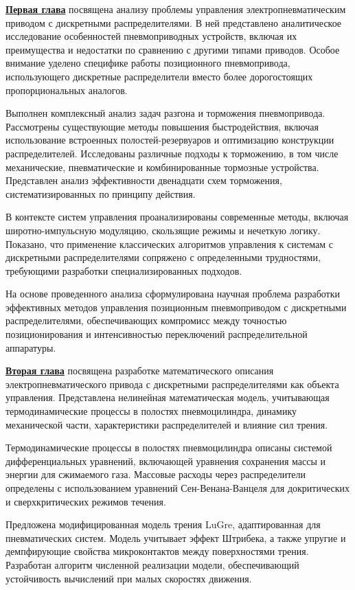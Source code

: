 \underline{\textbf{Первая глава}}
посвящена анализу проблемы управления электропневматическим приводом с
дискретными распределителями. В ней представлено аналитическое исследование
особенностей пневмоприводных устройств, включая их преимущества и недостатки
по сравнению с другими типами приводов. Особое внимание уделено специфике работы позиционного пневмопривода, использующего дискретные распределители вместо более дорогостоящих пропорциональных аналогов.

Выполнен комплексный анализ задач разгона и торможения пневмопривода. Рассмотрены
существующие методы повышения быстродействия, включая использование встроенных
полостей-резервуаров и оптимизацию конструкции распределителей. Исследованы различные
подходы к торможению, в том числе механические, пневматические и комбинированные тормозные
устройства. Представлен анализ эффективности двенадцати схем торможения, систематизированных по принципу действия.

В контексте систем управления проанализированы современные методы,
включая широтно-импульсную модуляцию, скользящие режимы и нечеткую логику.
Показано, что применение классических алгоритмов управления к системам с
дискретными распределителями сопряжено с определенными трудностями,
требующими разработки специализированных подходов.

На основе проведенного анализа сформулирована научная проблема
разработки эффективных методов управления позиционным пневмоприводом с
дискретными распределителями, обеспечивающих компромисс между точностью
позиционирования и интенсивностью переключений распределительной аппаратуры.

\underline{\textbf{Вторая глава}} 
посвящена разработке математического описания электропневматического
привода с дискретными распределителями как объекта управления. Представлена
нелинейная математическая модель, учитывающая термодинамические процессы в
полостях пневмоцилиндра, динамику механической части, характеристики распределителей и влияние сил трения.

Термодинамические процессы в полостях пневмоцилиндра описаны системой
дифференциальных уравнений, включающей уравнения сохранения массы и
энергии для сжимаемого газа. Массовые расходы через распределители определены с использованием
уравнений Сен-Венана-Ванцеля для докритических и сверхкритических режимов течения.

Предложена модифицированная модель трения LuGre, адаптированная для пневматических систем.
Модель учитывает эффект Штрибека, а также упругие и демпфирующие свойства микроконтактов
между поверхностями трения. Разработан алгоритм численной реализации модели,
обеспечивающий устойчивость вычислений при малых скоростях движения.

